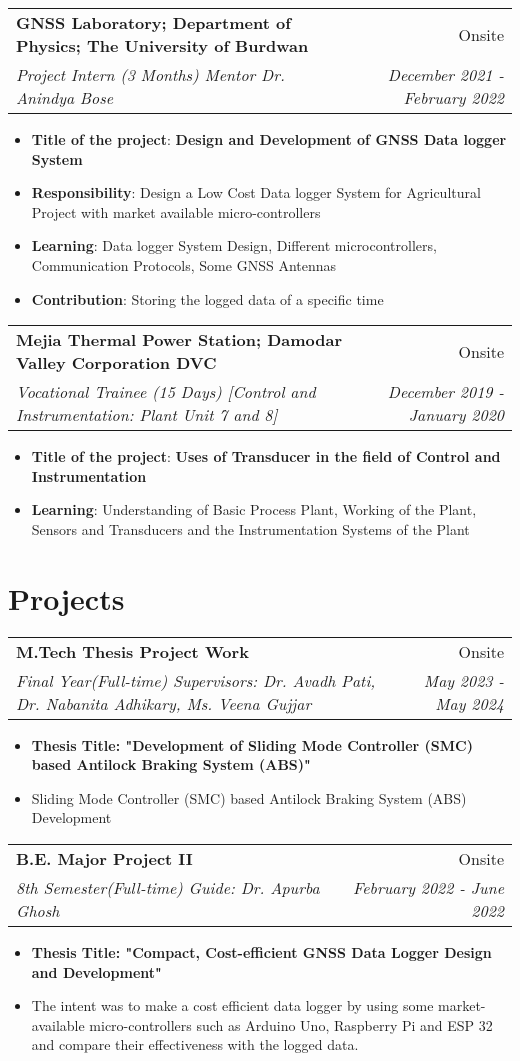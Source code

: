 \documentclass[a4paper,20pt]{article}
\makeatletter
\newcommand{\resumeItem}[2]{
  \item\small{
    \textbf{#1}{: #2 \vspace{-2pt}}
  }
}
\newcommand{\resumeSubheading}[4]{
  \vspace{-1pt}\item
    \begin{tabular*}{0.97\textwidth}{l@{\extracolsep{\fill}}r}
      \textbf{#1} & #2 \\
      \textit{#3} & \textit{#4} \\
    \end{tabular*}\vspace{-5pt}
}
\newcommand{\resumeItemListStart}{\begin{itemize}}
\newcommand{\resumeItemListEnd}{\end{itemize}\vspace{-5pt}}
\makeatother
\begin{document}
    \resumeSubheading{GNSS Laboratory; Department of Physics; The University of Burdwan }{Onsite}
    {Project Intern (3 Months) Mentor Dr. Anindya Bose}{December 2021 - February 2022}
    \resumeItemListStart
        \resumeItem {Title of the project}{\textbf{Design and Development of GNSS Data logger System}}
        \resumeItem {Responsibility}{Design a Low Cost Data logger System for Agricultural Project with market available micro-controllers}
        \resumeItem {Learning}{ Data logger System Design, Different microcontrollers, Communication Protocols, Some GNSS Antennas}
        \resumeItem {Contribution}{Storing the logged data of a specific time}
      \resumeItemListEnd
      
    \resumeSubheading{Mejia Thermal Power Station; Damodar Valley Corporation DVC}{Onsite}
    {Vocational  Trainee (15 Days) [Control and Instrumentation: Plant Unit 7 and 8] }
    {December 2019 - January 2020}
    \resumeItemListStart
        \resumeItem {Title of the project} {\textbf{Uses of Transducer in the field of Control and Instrumentation}}
        \resumeItem {Learning}{Understanding of Basic Process Plant, Working of the Plant, Sensors and Transducers and the Instrumentation Systems of the Plant}
      \resumeItemListEnd

\section{\textbf{Projects}}
\vspace{-5pt}

\resumeSubheading{M.Tech Thesis Project Work}{Onsite}
{Final Year(Full-time) Supervisors: Dr. Avadh Pati, Dr. Nabanita Adhikary, Ms. Veena Gujjar}{May 2023 - May 2024}
    \begin{itemize} 
\item {\textbf{Thesis Title: "Development of Sliding Mode Controller (SMC) based Antilock Braking System (ABS)" }}
\vspace{-5pt}
\item {Sliding Mode Controller (SMC) based Antilock Braking System (ABS) Development}
\end{itemize}

 \resumeSubheading{B.E. Major Project II  }{Onsite}
{8th Semester(Full-time) Guide: Dr. Apurba Ghosh}{February 2022 - June 2022}
    \begin{itemize} 
\item {\textbf{Thesis Title: "Compact, Cost-efficient GNSS Data Logger Design and Development" }}
\vspace{-5pt}
\item {The intent was to make a cost efficient data logger by using some market-available micro-controllers such as Arduino Uno, Raspberry Pi and ESP 32 and compare their effectiveness with the logged data.}
\end{itemize}
\end{document}
